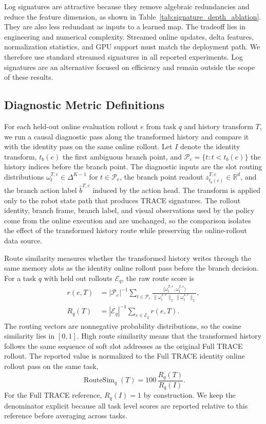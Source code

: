 \documentclass{article}
\begin{document}
Log signatures are attractive because they remove algebraic redundancies and reduce the feature dimension, as shown in Table~\ref{tab:signature_depth_ablation}. They are also less redundant as inputs to a learned map. The tradeoff lies in engineering and numerical complexity. Streamed online updates, delta features, normalization statistics, and GPU support must match the deployment path. We therefore use standard streamed signatures in all reported experiments. Log signatures are an alternative focused on efficiency and remain outside the scope of these results.

\subsection{Diagnostic Metric Definitions}
\label{app:diagnostic_metrics}

For each held-out online evaluation rollout $e$ from task $q$ and history transform $T$, we run a causal diagnostic pass along the transformed history and compare it with the identity pass on the same online rollout. Let $I$ denote the identity transform, $t_b(e)$ the first ambiguous branch point, and $\mathcal{P}_e=\{t:t<t_b(e)\}$ the history indices before the branch point. The diagnostic inputs are the slot routing distributions $\omega_t^{T,e}\in\Delta^{K-1}$ for $t\in\mathcal{P}_e$, the branch point readout $z_{t_b(e)}^{T,e}\in\mathbb{R}^{d}$, and the branch action label $\hat b^{T,e}$ induced by the action head. The transform is applied only to the robot state path that produces TRACE signatures. The rollout identity, branch frame, branch label, and visual observations used by the policy come from the online execution and are unchanged, so the comparison isolates the effect of the transformed history route while preserving the online-rollout data source.

Route similarity measures whether the transformed history writes through the same memory slots as the identity online rollout pass before the branch decision. For a task $q$ with held out rollouts $\mathcal{E}_q$, the raw route score is
\begin{align}
    r(e,T)
    &=
    |\mathcal{P}_e|^{-1}
    \sum_{t\in\mathcal{P}_e}
    \frac{
    \langle \omega_t^{T,e},\omega_t^{I,e}\rangle
    }{
    \|\omega_t^{T,e}\|_2\,
    \|\omega_t^{I,e}\|_2
    },
    \\
    R_q(T)
    &=
    |\mathcal{E}_q|^{-1}
    \sum_{e\in\mathcal{E}_q} r(e,T).
    \label{eq:route_raw}
\end{align}
The routing vectors are nonnegative probability distributions, so the cosine similarity lies in $[0,1]$. High route similarity means that the transformed history follows the same sequence of soft slot addresses as the original Full TRACE rollout. The reported value is normalized to the Full TRACE identity online rollout pass on the same task,
\begin{equation}
    \operatorname{RouteSim}_q(T)
    =
    100\,
    \frac{R_q(T)}{R_q(I)}.
    \label{eq:route_norm}
\end{equation}
For the Full TRACE reference, $R_q(I)=1$ by construction. We keep the denominator explicit because all task level scores are reported relative to this reference before averaging across tasks.
\end{document}
